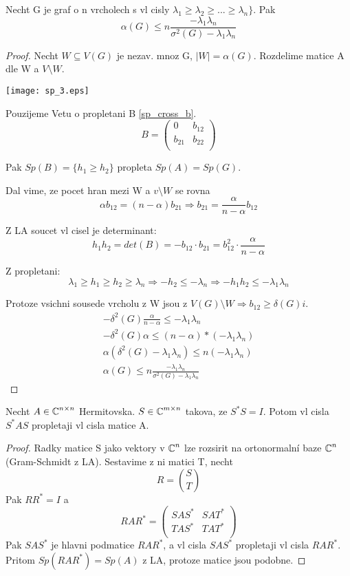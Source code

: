 \begin{theorem}
	Necht G je graf o n vrcholech s vl cisly $\lambda_1 \geq \lambda_2 \geq ... \geq \lambda_n \}$. Pak
	\[ \alpha(G) \leq n \frac{-\lambda_1\lambda_n}{\sigma^2(G) - \lambda_1\lambda_n} \]
\end{theorem}
\begin{proof}
	Necht $W \subseteq V(G)$ je nezav. mnoz G, $|W| = \alpha(G)$. Rozdelime matice A dle W a $V\setminus W$.

	\texttt{[image: sp\_3.eps]}

	Pouzijeme Vetu o propletani B \cref{sp_cross_b}.
	\[ B =
	\begin{pmatrix}
		0 & b_{12}\\
		b_{21} & b_{22}\\
	\end{pmatrix}
	\]

	Pak $Sp(B) = \{ h_1 \geq h_2 \}$ propleta $Sp(A) = Sp(G)$.

	Dal vime, ze pocet hran mezi W a $v\setminus W$ se rovna
	\[ \alpha b_{12} = (n - \alpha) b_{21} \Rightarrow b_{21} = \frac{\alpha}{n - \alpha} b_{12}\]

	Z LA soucet vl cisel je determinant:
	\[ h_1h_2 = det(B) = -b_{12} \cdot b_{21} = b_{12}^2 \cdot \frac{\alpha}{n - \alpha}\]

	Z propletani:
	\[ \lambda_1 \geq h_1 \geq h_2 \geq \lambda_n \Rightarrow -h_2 \leq -\lambda_n \Rightarrow -h_1h_2 \leq -\lambda_1 \lambda_n \]

	Protoze vsichni sousede vrcholu z W jsou z $V(G) \setminus W \Rightarrow b_{12} \geq \delta(G)i$.
	\begin{gather*}
	-\delta^2(G) \frac{\alpha}{n - \alpha} \leq -\lambda_1 \lambda_n\\
	-\delta^2(G) \alpha \leq (n - \alpha) * (-\lambda_1 \lambda_n)\\
	\alpha(\delta^2(G) - \lambda_1 \lambda_n) \leq n(-\lambda_1 \lambda_n)\\
	\alpha(G) \leq n \frac{-\lambda_1\lambda_n}{\sigma^2(G) - \lambda_1\lambda_n}
	\end{gather*}
\end{proof}

\begin{theorem}[Propletani A]\label{sp_cross_a}
	Necht $A \in \operatorname{\mathbb{C}}^{n \times n}$ Hermitovska. $S \in \operatorname{\mathbb{C}}^{m \times n}$ takova, ze $S^{\ast}S = I$.
	Potom vl cisla $S^{\ast}AS$ propletaji vl cisla matice A.
\end{theorem}
\begin{proof}
	Radky matice S jako vektory v $\operatorname{\mathbb{C}}^n$ lze rozsirit na ortonormalní baze $\operatorname{\mathbb{C}}^n$ (Gram-Schmidt z LA). Sestavime z ni matici T, necht
	\[ R = \binom{S}{T} \]
	Pak $RR^{\ast} = I$ a
\[
	RAR^{\ast} =
	\begin{pmatrix}
		SAS^{\ast} & SAT^{\ast} \\
		TAS^{\ast} & TAT^{\ast} \\
	\end{pmatrix}
\]
	Pak $SAS^{\ast}$ je hlavni podmatice $RAR^{\ast}$, a vl cisla $SAS^{\ast}$ propletaji vl cisla $RAR^{\ast}$.
	Pritom $Sp(RAR^{\ast}) = Sp(A)$ z LA, protoze matice jsou podobne.
\end{proof}


